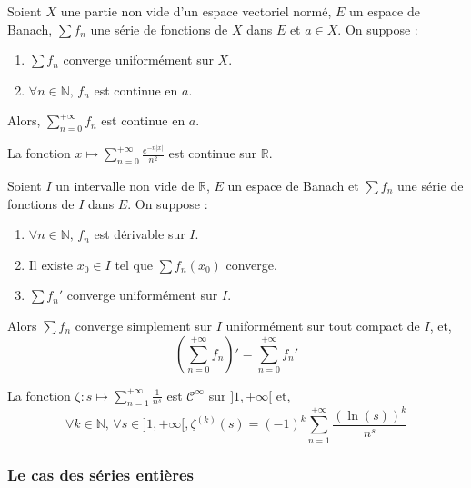   \begin{theorem}
    Soient $X$ une partie non vide d'un espace vectoriel normé, $E$ un espace de Banach, $\sum f_n$ une série de fonctions de $X$ dans $E$ et $a \in X$. On suppose :
    \begin{enumerate}[label=(\roman*)]
      \item $\sum f_n$ converge uniformément sur $X$.
      \item $\forall n \in \mathbb{N}, \, f_n$ est continue en $a$.
    \end{enumerate}
    Alors, $\sum_{n=0}^{+\infty} f_n$ est continue en $a$.
  \end{theorem}

  \begin{example}
    La fonction $x \mapsto \sum_{n=0}^{+\infty} \frac{e^{-n\vert x \vert}}{n^2}$ est continue sur $\mathbb{R}$.
  \end{example}

  \begin{theorem}
    Soient $I$ un intervalle non vide de $\mathbb{R}$, $E$ un espace de Banach et $\sum f_n$ une série de fonctions de $I$ dans $E$. On suppose :
    \begin{enumerate}[label=(\roman*)]
      \item $\forall n \in \mathbb{N}, \, f_n$ est dérivable sur $I$.
      \item Il existe $x_0 \in I$ tel que $\sum f_n(x_0)$ converge.
      \item $\sum f_n'$ converge uniformément sur $I$.
    \end{enumerate}
    Alors $\sum f_n$ converge simplement sur $I$ uniformément sur tout compact de $I$, et,
    \[ \left( \sum_{n=0}^{+\infty} f_n \right)' = \sum_{n=0}^{+\infty} f_n' \]
  \end{theorem}

  \begin{example}
    La fonction $\zeta : s \mapsto \sum_{n=1}^{+\infty} \frac{1}{n^s}$ est $\mathcal{C}^\infty$ sur $]1, +\infty[$ et,
    \[ \forall k \in \mathbb{N}, \, \forall s \in ]1, +\infty[, \zeta^{(k)}(s) = (-1)^k \sum_{n=1}^{+\infty} \frac{(\ln(s))^k}{n^s} \]
  \end{example}

  \subsubsection{Le cas des séries entières}


